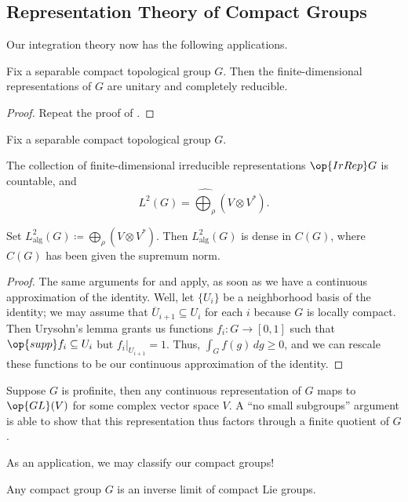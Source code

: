 \documentclass[../notes.tex]{subfiles}
\begin{document}
\subsection{Representation Theory of Compact Groups}
Our integration theory now has the following applications.
\begin{corollary}
	Fix a separable compact topological group $G$. Then the finite-dimensional representations of $G$ are unitary and completely reducible.
\end{corollary}
\begin{proof}
	Repeat the proof of .
\end{proof}
\begin{theorem} \label{thm:pw-compact}
	Fix a separable compact topological group $G$.
	\begin{listalph}
		\item The collection of finite-dimensional irreducible representations $\op{IrRep}G$ is countable, and
		\[L^2(G)=\widehat{\bigoplus_\rho}(V\otimes V^*).\]
		\item Set $L^2_{\mathrm{alg}}(G)\coloneqq\bigoplus_\rho(V\otimes V^*)$. Then $L^2_{\mathrm{alg}}(G)$ is dense in $C(G)$, where $C(G)$ has been given the supremum norm.
	\end{listalph}
\end{theorem}
\begin{proof}
	The same arguments for  and  apply, as soon as we have a continuous approximation of the identity. Well, let $\{U_i\}$ be a neighborhood basis of the identity; we may assume that $\overline U_{i+1}\subseteq U_{i}$ for each $i$ because $G$ is locally compact. Then Urysohn's lemma grants us functions $f_i\colon G\to[0,1]$ such that $\op{supp}f_i\subseteq U_i$ but $f_i|_{U_{i+1}}=1$. Thus, $\int_Gf(g)\,dg\ge0$, and we can rescale these functions to be our continuous approximation of the identity.
\end{proof}
\begin{remark}
	Suppose $G$ is profinite, then any continuous representation of $G$ maps to $\op{GL}(V)$ for some complex vector space $V$. A ``no small subgroups'' argument is able to show that this representation thus factors through a finite quotient of $G$.
\end{remark}
As an application, we may classify our compact groups!
\begin{corollary}
	Any compact group $G$ is an inverse limit of compact Lie groups.
\end{corollary}
\end{document}
